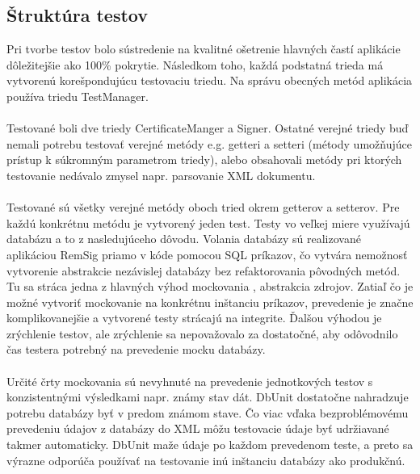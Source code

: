\documentclass[
  digital, %
  table,   %
oneside,
  nolof,     %
  nolot,     %
]{fithesis3}
\begin{document}
\subsection{Štruktúra testov}
Pri tvorbe testov bolo sústredenie na kvalitné ošetrenie hlavných častí aplikácie dôležitejšie ako 100\% pokrytie. Následkom toho, každá podstatná trieda má vytvorenú korešpondujúcu testovaciu triedu. Na správu obecných metód aplikácia používa triedu TestManager. \paragraph{}
Testované boli dve triedy CertificateManger a Signer. Ostatné verejné triedy buď nemali potrebu testovať verejné metódy e.g. getteri a setteri (métody umožňujúce prístup k súkromným parametrom triedy), alebo obsahovali metódy pri ktorých testovanie nedávalo zmysel napr. parsovanie XML dokumentu. \paragraph{}
Testované sú všetky verejné metódy oboch tried okrem getterov a setterov. Pre každú konkrétnu metódu je vytvorený jeden test. Testy vo veľkej miere využívajú databázu a to z nasledujúceho dôvodu. Volania databázy sú realizované aplikáciou RemSig priamo v kóde pomocou SQL príkazov, čo vytvára nemožnosť vytvorenie abstrakcie nezávislej databázy bez refaktorovania pôvodných metód. Tu sa stráca jedna z hlavných výhod mockovania \cite{mocking}, abstrakcia zdrojov. Zatiaľ čo je možné vytvoriť mockovanie na konkrétnu inštanciu príkazov, prevedenie je značne komplikovanejšie a vytvorené testy strácajú na integrite. Ďalšou výhodou je zrýchlenie testov, ale zrýchlenie sa nepovažovalo za dostatočné, aby odôvodnilo čas testera potrebný na prevedenie mocku databázy. \paragraph{}
Určité črty mockovania sú nevyhnuté na prevedenie jednotkových testov s konzistentnými výsledkami napr. známy stav dát. DbUnit dostatočne nahradzuje potrebu  databázy byť v predom známom stave. Čo viac vďaka bezproblémovému prevedeniu údajov z databázy do XML môžu testovacie údaje byť udržiavané takmer automaticky. DbUnit maže údaje po každom prevedenom teste, a preto sa výrazne odporúča používať na testovanie inú inštanciu databázy ako produkčnú. \paragraph{}
\end{document}
